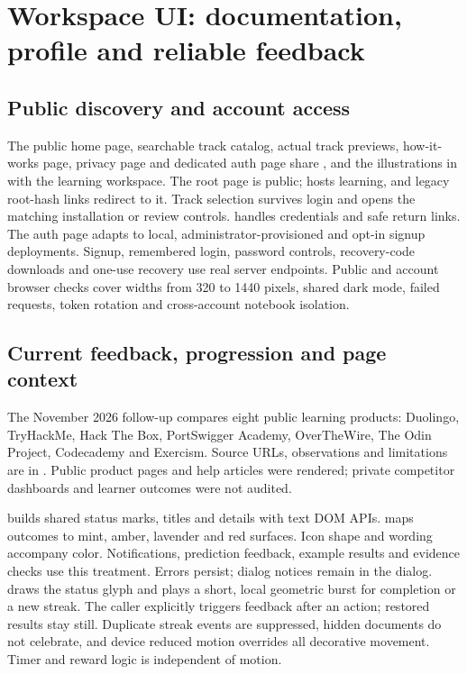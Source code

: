 \section{Workspace UI: documentation, profile and reliable feedback}
\label{workspace-ui}
\subsection{Public discovery and account access}
The public home page, searchable track catalog, actual track previews,
how-it-works page, privacy page and dedicated auth page share
,  and the illustrations in
 with the learning workspace. The root page is public;
 hosts learning, and legacy root-hash links redirect to it.
Track selection survives login and opens the matching installation or review
controls.  handles credentials and safe return links.
The auth page adapts to local, administrator-provisioned and opt-in signup
deployments. Signup, remembered login, password controls, recovery-code downloads
and one-use recovery use real server endpoints. Public and account browser
checks cover widths from 320 to 1440 pixels, shared dark mode, failed requests,
token rotation and cross-account notebook isolation.

\subsection{Current feedback, progression and page context}
The November 2026 follow-up compares eight public learning products: Duolingo,
TryHackMe, Hack The Box, PortSwigger Academy, OverTheWire, The Odin Project,
Codecademy and Exercism. Source URLs, observations and limitations are in
. Public product pages and help articles
were rendered; private competitor dashboards and learner outcomes were not audited.

 builds shared status marks, titles and details with text
DOM APIs.  maps outcomes to mint, amber, lavender and red
surfaces. Icon shape and wording accompany color. Notifications, prediction
feedback, example results and evidence checks use this treatment. Errors persist;
dialog notices remain in the dialog.  draws the status glyph
and plays a short, local geometric burst for completion or a new streak. The
caller explicitly triggers feedback after an action; restored results stay still.
Duplicate streak events are suppressed, hidden documents do not celebrate, and
device reduced motion overrides all decorative movement. Timer and reward logic
is independent of motion.

